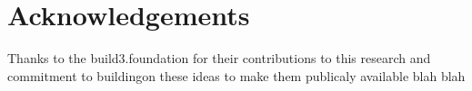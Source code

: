 \section*{Acknowledgements}

Thanks to the build3.foundation for their contributions to this research and
commitment to buildingon these ideas to make them publicaly available blah blah

\cleardoublepage
